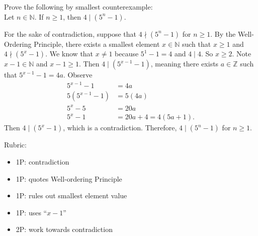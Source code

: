 \documentclass{article}
\newcommand{\Z}{\mathbb{Z}}
\theoremstyle{definition}
\begin{document}
\begin{question}{6}
    Prove the following by smallest counterexample:\\
    Let $n\in \mathbb{N}$. If $n\geq 1$, then $4 \mid (5^n-1)$.
\end{question}
\begin{solution}
      For the sake of contradiction, suppose that $4 \nmid (5^n-1)$ for $n\geq 1$. By the Well-Ordering Principle, there exists a smallest element $x\in \mathbb{N}$ such that $x\geq 1$ and $4 \nmid (5^x-1)$. We know that $x\neq 1$ because $5^1-1=4$ and $4\mid 4$. So $x\geq 2$. Note $x-1\in \mathbb{N}$ and $x-1\geq 1$. Then $4\mid (5^{x-1}-1)$, meaning there exists $a\in \Z$ such that $5^{x-1}-1 = 4a$. Observe
      \begin{align*}
      5^{x-1}-1 &= 4a\\
      5(5^{x-1}-1) &= 5(4a)\\
      5^x - 5 &= 20a\\
      5^x -1 &= 20a +4 = 4(5a+1).
      \end{align*}
      Then $4\mid (5^x-1)$, which is a contradiction. Therefore, $4 \mid (5^n-1)$ for $n\geq 1$.
{\color{red} Rubric:
\begin{itemize}
\item 1P: contradiction
\item 1P: quotes Well-ordering Principle
\item 1P: rules out smallest element value
\item 1P: uses ``$x-1$''
\item 2P: work towards contradiction
\end{itemize}}
\end{solution}
\end{document}

